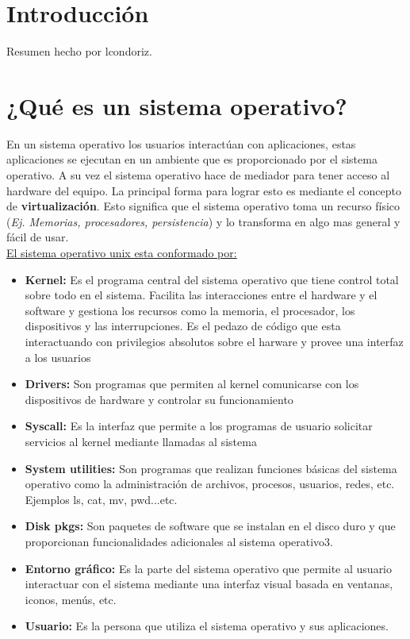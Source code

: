 \documentclass[../main.tex]{subfiles}
\begin{document}
    \section{Introducción} 
        Resumen hecho por lcondoriz.

    \section*{¿Qué es un sistema operativo?}
        En un sistema operativo los usuarios interactúan con aplicaciones, estas
        aplicaciones se ejecutan en un ambiente que es proporcionado por el sistema operativo. A su vez el sistema operativo hace de mediador para tener acceso al hardware del equipo.
        La principal forma para lograr esto es mediante el concepto de \textbf{virtualización}. Esto significa que el sistema operativo toma un recurso físico (\textit{Ej. Memorias, procesadores, persistencia}) y lo transforma en algo mas general y fácil de usar.\\

        \underline{El sistema operativo unix esta conformado por:}
        \begin{itemize}
            \item \textbf{Kernel:}
                Es el programa central del sistema operativo que tiene control total sobre todo en el sistema. Facilita las interacciones entre el hardware y el software y gestiona los recursos como la memoria, el procesador, los dispositivos y las interrupciones. Es el pedazo de código que esta interactuando con privilegios absolutos sobre el harware y provee una interfaz a los usuarios
            \item \textbf{Drivers:} 
                Son programas que permiten al kernel comunicarse con los dispositivos de hardware y controlar su funcionamiento

            \item \textbf{Syscall:}
                Es la interfaz que permite a los programas de usuario solicitar servicios al kernel mediante llamadas al sistema
            \item \textbf{System utilities:}
                Son programas que realizan funciones básicas del sistema operativo como la administración de archivos, procesos, usuarios, redes, etc. Ejemplos ls, cat, mv, pwd...etc.
            \item \textbf{Disk pkgs:}
                Son paquetes de software que se instalan en el disco duro y que proporcionan funcionalidades adicionales al sistema operativo3.
            \item \textbf{Entorno gráfico:}
                Es la parte del sistema operativo que permite al usuario interactuar con el sistema mediante una interfaz visual basada en ventanas, iconos, menús, etc.
            \item \textbf{Usuario:}
                Es la persona que utiliza el sistema operativo y sus aplicaciones.
        \end{itemize}
\end{document}
